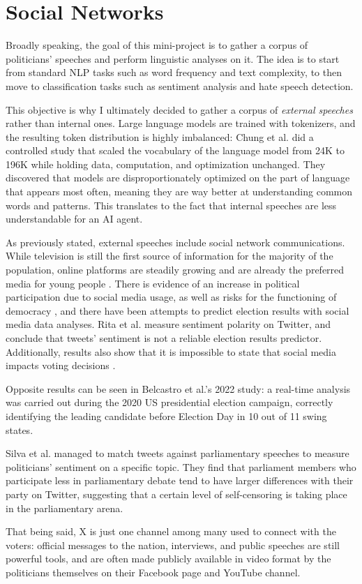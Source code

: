 \section{Social Networks}

Broadly speaking, the goal of this mini-project is to gather a corpus of politicians' speeches and perform linguistic analyses on it. The idea is to start from standard NLP tasks such as word frequency and text complexity, to then move to classification tasks such as sentiment analysis and hate speech detection.

This objective is why I ultimately decided to gather a corpus of \textit{external speeches} rather than internal ones. Large language models are trained with tokenizers, and the resulting token distribution is highly imbalanced: Chung et al. \cite{chung_exploiting_2025} did a controlled study that scaled the vocabulary of the language model from 24K to 196K while holding data, computation, and optimization unchanged. They discovered that models are disproportionately optimized on the part of language that appears most often, meaning they are way better at understanding common words and patterns. This translates to the fact that internal speeches are less understandable for an AI agent. 

As previously stated, external speeches include social network communications. While television is still the first source of information for the majority of the population, online platforms are steadily growing and are already the preferred media for young people \cite{eurobarometer_media_2023,maher_twice_2024}. There is evidence of an increase in political participation due to social media usage, as well as risks for the functioning of democracy \cite{lorenz-spreen_systematic_2023,amsalem_people_2023}, and there have been attempts to predict election results with social media data analyses. Rita et al. measure sentiment polarity on Twitter, and conclude that tweets' sentiment is not a reliable election results predictor. Additionally, results also show that it is impossible to state that social media impacts voting decisions \cite{rita_social_2023}. 

Opposite results can be seen in Belcastro et al.'s \cite{belcastro_analyzing_2022} 2022 study: a real-time analysis was carried out during the 2020 US presidential election campaign, correctly identifying the leading candidate before Election Day in 10 out of 11 swing states.

Silva et al. \cite{silva_politicians_2022} managed to match tweets against parliamentary speeches to measure politicians' sentiment on a specific topic. They find that parliament members who participate less in parliamentary debate tend to have larger differences with their party on Twitter, suggesting that a certain level of self-censoring is taking place in the parliamentary arena.

That being said, X is just one channel among many used to connect with the voters: official messages to the nation, interviews, and public speeches are still powerful tools, and are often made publicly available in video format by the politicians themselves on their Facebook page and YouTube channel.
